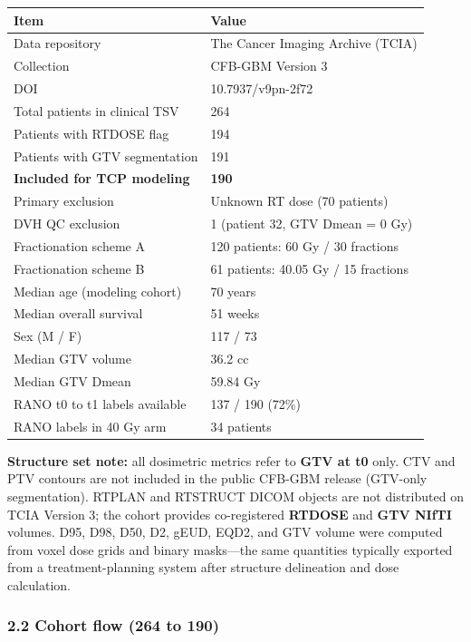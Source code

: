 \documentclass[
  11pt,
]{article}
\begin{document}
\begin{longtable}[]{@{}ll@{}}
\toprule\noalign{}
Item & Value \\
\midrule\noalign{}
\endhead
\bottomrule\noalign{}
\endlastfoot
Data repository & The Cancer Imaging Archive (TCIA) \\
Collection & CFB-GBM Version 3 \\
DOI & 10.7937/v9pn-2f72 \\
Total patients in clinical TSV & 264 \\
Patients with RTDOSE flag & 194 \\
Patients with GTV segmentation & 191 \\
\textbf{Included for TCP modeling} & \textbf{190} \\
Primary exclusion & Unknown RT dose (70 patients) \\
DVH QC exclusion & 1 (patient 32, GTV Dmean = 0 Gy) \\
Fractionation scheme A & 120 patients: 60 Gy / 30 fractions \\
Fractionation scheme B & 61 patients: 40.05 Gy / 15 fractions \\
Median age (modeling cohort) & 70 years \\
Median overall survival & 51 weeks \\
Sex (M / F) & 117 / 73 \\
Median GTV volume & 36.2 cc \\
Median GTV Dmean & 59.84 Gy \\
RANO t0 to t1 labels available & 137 / 190 (72\%) \\
RANO labels in 40 Gy arm & 34 patients \\
\end{longtable}

\textbf{Structure set note:} all dosimetric metrics refer to \textbf{GTV
at t0} only. CTV and PTV contours are not included in the public CFB-GBM
release (GTV-only segmentation). RTPLAN and RTSTRUCT DICOM objects are
not distributed on TCIA Version 3; the cohort provides co-registered
\textbf{RTDOSE} and \textbf{GTV NIfTI} volumes. D95, D98, D50, D2, gEUD,
EQD2, and GTV volume were computed from voxel dose grids and binary
masks---the same quantities typically exported from a treatment-planning
system after structure delineation and dose calculation.

\subsubsection{2.2 Cohort flow (264 to
190)}\label{cohort-flow-264-to-190}
\end{document}
